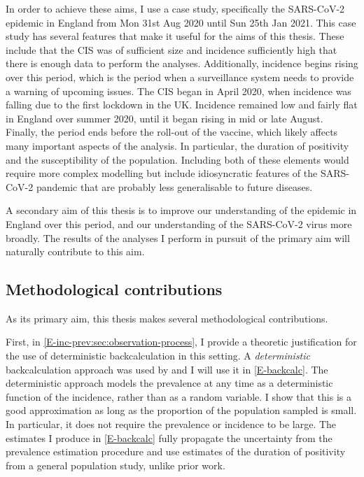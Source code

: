 \documentclass[thesis.tex]{subfiles}
\begin{document}
In order to achieve these aims, I use a case study, specifically the SARS-CoV-2 epidemic in England from Mon 31st Aug 2020 until Sun 25th Jan 2021.
This case study has several features that make it useful for the aims of this thesis.
These include that the CIS was of sufficient size and incidence sufficiently high that there is enough data to perform the analyses.
Additionally, incidence begins rising over this period, which is the period when a surveillance system needs to provide a warning of upcoming issues.
The CIS began in April 2020, when incidence was falling due to the first lockdown in the UK.
Incidence remained low and fairly flat in England over summer 2020, until it began rising in mid or late August.
Finally, the period ends before the roll-out of the vaccine, which likely affects many important aspects of the analysis.
In particular, the duration of positivity and the susceptibility of the population.
Including both of these elements would require more complex modelling but include idiosyncratic features of the SARS-CoV-2 pandemic that are probably less generalisable to future diseases.

A secondary aim of this thesis is to improve our understanding of the epidemic in England over this period, and our understanding of the SARS-CoV-2 virus more broadly.
The results of the analyses I perform in pursuit of the primary aim will naturally contribute to this aim.

\subsection{Methodological contributions}

As its primary aim, this thesis makes several methodological contributions.

First, in \cref{E-inc-prev:sec:observation-process}, I provide a theoretic justification for the use of deterministic backcalculation in this setting.
A \emph{deterministic} backcalculation approach was used by \textcite{abbottCISincidence} and I will use it in \cref{E-backcalc}.
The deterministic approach models the prevalence at any time as a deterministic function of the incidence, rather than as a random variable.
I show that this is a good approximation as long as the proportion of the population sampled is small.
In particular, it does not require the prevalence or incidence to be large.
The estimates I produce in \cref{E-backcalc} fully propagate the uncertainty from the prevalence estimation procedure and use estimates of the duration of positivity from a general population study, unlike prior work.
\end{document}
